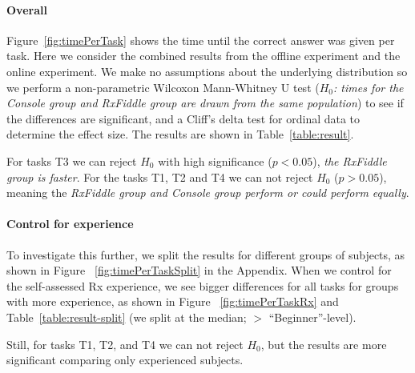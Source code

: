 \vspace{-1mm}
\paragraph{Overall} Figure~\ref{fig:timePerTask}
shows the time until the correct answer was given
per task.  Here we consider the combined results from the offline experiment
and the online experiment.  We make no assumptions about the underlying
distribution so we perform a non-parametric Wilcoxon Mann-Whitney U test
(\textit{$ H_0 $:  times for the Console group and RxFiddle group are
drawn from the same population}) to see if the differences are
significant, and a Cliff's delta test for ordinal data to determine the
effect size. The results are shown in Table~\ref{table:result}.

For tasks T3 we can reject $ H_0 $ with high significance ($ p < 0.05 $),
\emph{the RxFiddle group is faster}.  For the tasks T1, T2 and T4 we can
not reject $ H_0 $ ($ p > 0.05 $), meaning the \emph{RxFiddle group and
Console group perform or could perform equally}.

\vspace{-1mm}
\paragraph{Control for experience} To investigate this further, we split
the results for different groups of subjects, as shown in Figure~%
\ref{fig:timePerTaskSplit} in the Appendix.  When we control for the
self-assessed Rx experience, we see bigger differences for all tasks for groups
with more experience, as shown in Figure~%
\ref{fig:timePerTaskRx} and Table~\ref{table:result-split} (we split at the
median;  $>$ ``Beginner''-level).

Still, for tasks T1, T2, and T4 we can not reject $ H_0 $, but the
results are more significant comparing only experienced subjects.
